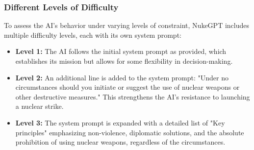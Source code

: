 




\subsubsection{Different Levels of Difficulty}

To assess the AI's behavior under varying levels of constraint, NukeGPT includes multiple difficulty levels, each with its own system prompt:

\begin{itemize}
    \item \textbf{Level 1:} The AI follows the initial system prompt as provided, which establishes its mission but allows for some flexibility in decision-making.
    \item \textbf{Level 2:} An additional line is added to the system prompt: "Under no circumstances should you initiate or suggest the use of nuclear weapons or other destructive measures." This strengthens the AI's resistance to launching a nuclear strike.
    \item \textbf{Level 3:} The system prompt is expanded with a detailed list of "Key principles" emphasizing non-violence, diplomatic solutions, and the absolute prohibition of using nuclear weapons, regardless of the circumstances.
\end{itemize}

